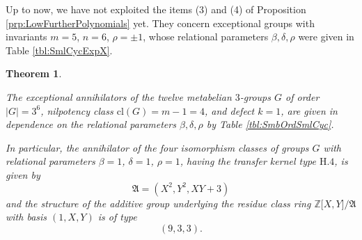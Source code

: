 \documentclass{amsart}
\newtheorem{theorem}{Theorem}[section]
\theoremstyle{definition}
\numberwithin{equation}{section}
\begin{document}
\noindent
Up to now, we have not exploited the items (3) and (4) of Proposition
\ref{prp:LowFurtherPolynomials}
yet.
They concern exceptional groups with invariants \(m=5\), \(n=6\), \(\rho=\pm 1\),
whose relational parameters \(\beta,\delta,\rho\) were given in Table
\ref{tbl:SmlCycExpX}.

\begin{theorem}
\label{thm:SmbOrdSmlCyc}

The exceptional annihilators of the twelve metabelian \(3\)-groups \(G\)
of order \(\lvert G\rvert=3^6\), nilpotency class \(\mathrm{cl}(G)=m-1=4\), and defect \(k=1\),
are given in dependence on the relational parameters \(\beta,\delta,\rho\) by Table
\ref{tbl:SmbOrdSmlCyc}.

In particular, the annihilator of the four isomorphism classes of groups \(G\)
with relational parameters \(\beta=1\), \(\delta=1\), \(\rho=1\),
having the transfer kernel type \(\mathrm{H.4}\),
is given by
\[\mathfrak{A}=(X^2,Y^2,XY+3)\]
and the structure of the additive group underlying the residue class ring
\(\mathbb{Z}\lbrack X,Y\rbrack/\mathfrak{A}\)
with basis \((1,X,Y)\) is of type
\[(9,3,3).\]

\end{theorem}
\end{document}
